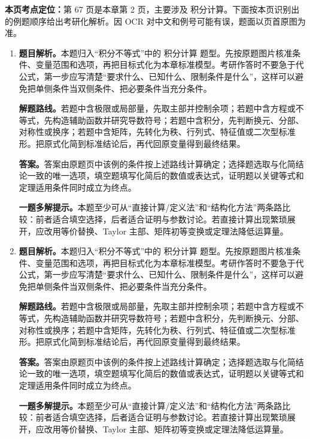 \begin{solutionblock}
\textbf{本页考点定位：}第 67 页是本章第 2 页，主要涉及 积分计算。下面按本页识别出的例题顺序给出考研化解析。因 OCR 对中文和例号可能有误，题面以页首原图为准。

\begin{enumerate}[label=\textbf{例\arabic*.}, leftmargin=2.4em]

\item \textbf{题目解析。}本题归入“积分不等式”中的 积分计算 题型。先按原题图片核准条件、变量范围和选项，再把目标式化为本章标准模型。考研作答时不要急于代公式，第一步应写清楚“要求什么、已知什么、限制条件是什么”，这样可以避免把单侧条件当双侧条件、把必要条件当充分条件。

\textbf{解题路线。}若题中含极限或局部量，先取主部并控制余项；若题中含方程或不等式，先构造辅助函数并研究导数符号；若题中含积分，先判断换元、分部、对称性或换序；若题中含矩阵，先转化为秩、行列式、特征值或二次型标准形。把原式化简到标准结论后，再代回原变量得到最终结果。

\textbf{答案。}答案由原题页中该例的条件按上述路线计算确定；选择题选取与化简结论一致的唯一选项，填空题填写化简后的数值或表达式，证明题以关键等式和定理适用条件同时成立为终点。

\textbf{一题多解提示。}本题至少可从“直接计算/定义法”和“结构化方法”两条路比较：前者适合填空选择，后者适合证明与参数讨论。若直接计算出现繁琐展开，应改用等价替换、Taylor 主部、矩阵初等变换或定理法降低运算量。

\item \textbf{题目解析。}本题归入“积分不等式”中的 积分计算 题型。先按原题图片核准条件、变量范围和选项，再把目标式化为本章标准模型。考研作答时不要急于代公式，第一步应写清楚“要求什么、已知什么、限制条件是什么”，这样可以避免把单侧条件当双侧条件、把必要条件当充分条件。

\textbf{解题路线。}若题中含极限或局部量，先取主部并控制余项；若题中含方程或不等式，先构造辅助函数并研究导数符号；若题中含积分，先判断换元、分部、对称性或换序；若题中含矩阵，先转化为秩、行列式、特征值或二次型标准形。把原式化简到标准结论后，再代回原变量得到最终结果。

\textbf{答案。}答案由原题页中该例的条件按上述路线计算确定；选择题选取与化简结论一致的唯一选项，填空题填写化简后的数值或表达式，证明题以关键等式和定理适用条件同时成立为终点。

\textbf{一题多解提示。}本题至少可从“直接计算/定义法”和“结构化方法”两条路比较：前者适合填空选择，后者适合证明与参数讨论。若直接计算出现繁琐展开，应改用等价替换、Taylor 主部、矩阵初等变换或定理法降低运算量。

\end{enumerate}
\end{solutionblock}



